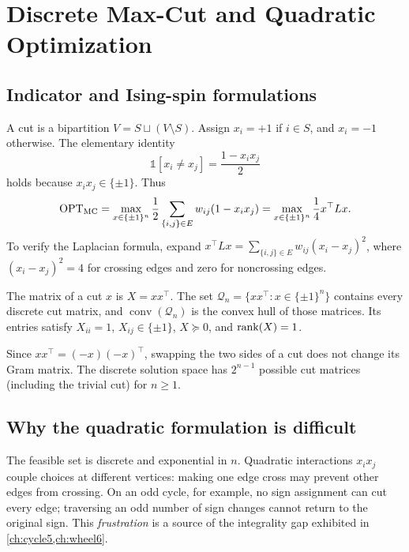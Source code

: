 \chapter{Discrete Max-Cut and Quadratic Optimization}\label{ch:discrete}
\section{Indicator and Ising-spin formulations}
A cut is a bipartition $V=S\sqcup (V\setminus S)$. Assign $x_i=+1$ if $i\in S$, and $x_i=-1$ otherwise. The elementary identity
\begin{equation}\label{eq:cut-indicator}
\mathbb{1}[x_i\ne x_j]=\frac{1-x_ix_j}{2}
\end{equation}
holds because $x_ix_j\in\{\pm1\}$. Thus
\begin{equation}\label{eq:iqp}
\operatorname{OPT}_{\mathrm{MC}}=\max_{x\in\{\pm1\}^n}\frac12\sum_{\{i,j\}\in E}w_{ij}(1-x_ix_j)=\max_{x\in\{\pm1\}^n}\frac14x^\top Lx.
\end{equation}
To verify the Laplacian formula, expand $x^\top Lx=\sum_{\{i,j\}\in E}w_{ij}(x_i-x_j)^2$, where $(x_i-x_j)^2=4$ for crossing edges and zero for noncrossing edges.

\begin{definition}
The matrix of a cut $x$ is $X=xx^\top$. The set $\mathcal Q_n=\{xx^\top:x\in\{\pm1\}^n\}$ contains every discrete cut matrix, and $\operatorname{conv}(\mathcal Q_n)$ is the convex hull of those matrices. Its entries satisfy $X_{ii}=1$, $X_{ij}\in\{\pm1\}$, $X\succeq0$, and $\operatorname{rank}(X)=1$.
\end{definition}
Since $xx^\top=(-x)(-x)^\top$, swapping the two sides of a cut does not change its Gram matrix. The discrete solution space has $2^{n-1}$ possible cut matrices (including the trivial cut) for $n\ge1$.

\section{Why the quadratic formulation is difficult}
The feasible set is discrete and exponential in $n$. Quadratic interactions $x_ix_j$ couple choices at different vertices: making one edge cross may prevent other edges from crossing. On an odd cycle, for example, no sign assignment can cut every edge; traversing an odd number of sign changes cannot return to the original sign. This \emph{frustration} is a source of the integrality gap exhibited in \cref{ch:cycle5,ch:wheel6}.

